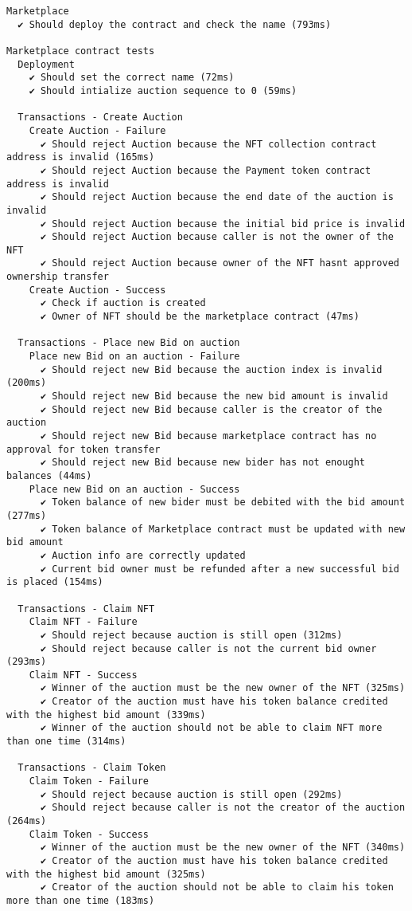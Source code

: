 \documentclass{article}
\begin{document}
\begin{lstlisting}[caption={Hardhat Test Results},basicstyle=\footnotesize\ttfamily]
Marketplace
  ✔ Should deploy the contract and check the name (793ms)

Marketplace contract tests
  Deployment
    ✔ Should set the correct name (72ms)
    ✔ Should intialize auction sequence to 0 (59ms)
  
  Transactions - Create Auction
    Create Auction - Failure
      ✔ Should reject Auction because the NFT collection contract address is invalid (165ms)
      ✔ Should reject Auction because the Payment token contract address is invalid
      ✔ Should reject Auction because the end date of the auction is invalid
      ✔ Should reject Auction because the initial bid price is invalid
      ✔ Should reject Auction because caller is not the owner of the NFT
      ✔ Should reject Auction because owner of the NFT hasnt approved ownership transfer
    Create Auction - Success
      ✔ Check if auction is created
      ✔ Owner of NFT should be the marketplace contract (47ms)
  
  Transactions - Place new Bid on auction
    Place new Bid on an auction - Failure
      ✔ Should reject new Bid because the auction index is invalid (200ms)
      ✔ Should reject new Bid because the new bid amount is invalid
      ✔ Should reject new Bid because caller is the creator of the auction
      ✔ Should reject new Bid because marketplace contract has no approval for token transfer
      ✔ Should reject new Bid because new bider has not enought balances (44ms)
    Place new Bid on an auction - Success
      ✔ Token balance of new bider must be debited with the bid amount (277ms)
      ✔ Token balance of Marketplace contract must be updated with new bid amount
      ✔ Auction info are correctly updated
      ✔ Current bid owner must be refunded after a new successful bid is placed (154ms)
  
  Transactions - Claim NFT
    Claim NFT - Failure
      ✔ Should reject because auction is still open (312ms)
      ✔ Should reject because caller is not the current bid owner (293ms)
    Claim NFT - Success
      ✔ Winner of the auction must be the new owner of the NFT (325ms)
      ✔ Creator of the auction must have his token balance credited with the highest bid amount (339ms)
      ✔ Winner of the auction should not be able to claim NFT more than one time (314ms)
  
  Transactions - Claim Token
    Claim Token - Failure
      ✔ Should reject because auction is still open (292ms)
      ✔ Should reject because caller is not the creator of the auction (264ms)
    Claim Token - Success
      ✔ Winner of the auction must be the new owner of the NFT (340ms)
      ✔ Creator of the auction must have his token balance credited with the highest bid amount (325ms)
      ✔ Creator of the auction should not be able to claim his token more than one time (183ms)
  

\end{lstlisting}
\end{document}
